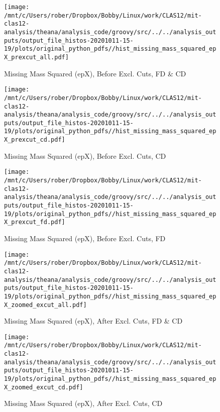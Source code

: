\documentclass{article}
\begin{document}
\begin{landscape}
\begin{figure}[h]
        \texttt{[image: /mnt/c/Users/rober/Dropbox/Bobby/Linux/work/CLAS12/mit-clas12-analysis/theana/analysis\_code/groovy/src/../../analysis\_outputs/output\_file\_histos-20201011-15-19/plots/original\_python\_pdfs//hist\_missing\_mass\_squared\_epX\_prexcut\_all.pdf]}
        \captionsetup{textformat=empty,labelformat=blank}
        \caption{Missing Mass Squared (epX), Before Excl. Cuts, FD \& CD}
    \end{figure}
    \clearpage
    
    \begin{figure}[h]
        \centering

        \texttt{[image: /mnt/c/Users/rober/Dropbox/Bobby/Linux/work/CLAS12/mit-clas12-analysis/theana/analysis\_code/groovy/src/../../analysis\_outputs/output\_file\_histos-20201011-15-19/plots/original\_python\_pdfs//hist\_missing\_mass\_squared\_epX\_prexcut\_cd.pdf]}
        \captionsetup{textformat=empty,labelformat=blank}
        \caption{Missing Mass Squared (epX), Before Excl. Cuts, CD}
    \end{figure}
    \clearpage
    
    \begin{figure}[h]
        \centering

        \texttt{[image: /mnt/c/Users/rober/Dropbox/Bobby/Linux/work/CLAS12/mit-clas12-analysis/theana/analysis\_code/groovy/src/../../analysis\_outputs/output\_file\_histos-20201011-15-19/plots/original\_python\_pdfs//hist\_missing\_mass\_squared\_epX\_prexcut\_fd.pdf]}
        \captionsetup{textformat=empty,labelformat=blank}
        \caption{Missing Mass Squared (epX), Before Excl. Cuts, FD}
    \end{figure}
    \clearpage
    
    \begin{figure}[h]
        \centering

        \texttt{[image: /mnt/c/Users/rober/Dropbox/Bobby/Linux/work/CLAS12/mit-clas12-analysis/theana/analysis\_code/groovy/src/../../analysis\_outputs/output\_file\_histos-20201011-15-19/plots/original\_python\_pdfs//hist\_missing\_mass\_squared\_epX\_zoomed\_excut\_all.pdf]}
        \captionsetup{textformat=empty,labelformat=blank}
        \caption{Missing Mass Squared (epX), After Excl. Cuts, FD \& CD}
    \end{figure}
    \clearpage
    
    \begin{figure}[h]
        \centering

        \texttt{[image: /mnt/c/Users/rober/Dropbox/Bobby/Linux/work/CLAS12/mit-clas12-analysis/theana/analysis\_code/groovy/src/../../analysis\_outputs/output\_file\_histos-20201011-15-19/plots/original\_python\_pdfs//hist\_missing\_mass\_squared\_epX\_zoomed\_excut\_cd.pdf]}
        \captionsetup{textformat=empty,labelformat=blank}
        \caption{Missing Mass Squared (epX), After Excl. Cuts, CD}
    \end{figure}
    \clearpage
    

\end{landscape}
\end{document}
